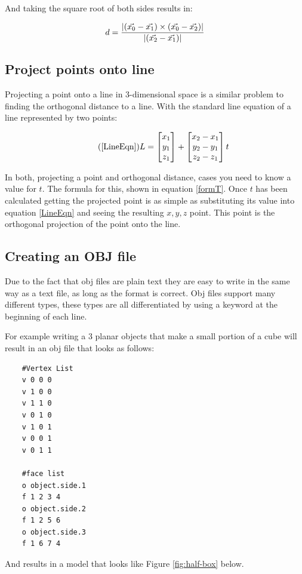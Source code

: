 	And taking the square root of both sides results in:
	
	\begin{equation}
	d = \frac{ \lvert  (\vec{x_0} - \vec{x_1}) \times (\vec{x_0} - \vec{x_2}) \rvert}{\lvert (\vec{x_2} - \vec{x_1}) \rvert}
	\end{equation}

	\subsection{Project points onto line}
	\label{ProjectionOntoLine}
	Projecting a point onto a line in 3-dimensional space is a similar problem to finding the orthogonal distance to a line. With the standard line equation of a line represented by two points:
	
	\begin{equation}\tag{\ref{LineEqn}}
		L = \begin{bmatrix}
		x_1 \\
		y_1\\
		z_1 
		\end{bmatrix} + \begin{bmatrix}
		x_2 - x_1 \\
		y_2 - y_1\\
		z_2 - z_1
		\end{bmatrix}t
	\end{equation}
	
	In both, projecting a point and orthogonal distance, cases you need to know a value for $t$. The formula for this, shown in equation \ref{formT}. Once $t$ has been calculated getting the projected point is as simple as substituting its value into equation \ref{LineEqn} and seeing the resulting $x,y,z$ point. This point is the orthogonal projection of the point onto the line.
	
	\subsection{Creating an OBJ file}
	\label{makeOBJfile}
	Due to the fact that obj files are plain text they are easy to write in the same way as a text file, as long as the format is correct. Obj files support many different types, these types are all differentiated by using a keyword at the beginning of each line. 
	
	For example writing a 3 planar objects that make a small portion of a cube will result in an obj file that looks as follows:
	\newpage
	\begin{lstlisting}
	#Vertex List
	v 0 0 0
	v 1 0 0
	v 1 1 0
	v 0 1 0
	v 1 0 1
	v 0 0 1
	v 0 1 1

	#face list
	o object.side.1
	f 1 2 3 4
	o object.side.2
	f 1 2 5 6
	o object.side.3
	f 1 6 7 4
	\end{lstlisting}
	And results in a model that looks like Figure \ref{fig:half-box} below.
	

